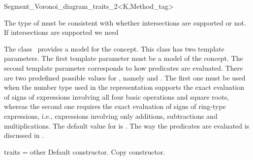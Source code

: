 


\begin{ccRefClass}{Segment_Voronoi_diagram_traits_2<K,Method_tag>}


{\sc The type of  must be consistent with whether
  intersections are supported or not. If intersections are supported
  we need }

\ccDefinition
  
The class \ccRefName\ provides a model for the
 concept.
This class has two template parameters. The first template parameter
must be a model of the  concept. The second template
parameter corresponds to how predicates are evaluated. There are two
predefined possible values for , namely
 and . The first one
must be used when the number type used in the representation supports
the exact evaluation of signs of expressions involving all four basic
operations and square roots, whereas the second one requires the exact
evaluation of signs of ring-type expressions, i.e., expressions
involving only additions, subtractions and multiplications. The
default value for  is .
%
The way the predicates are evaluated is discussed in
\cite{b-ecvdl-96,k-peasv-04}.



\ccIsModel
{}

\ccCreation
{}
{traits = other}{}
\ccThreeToTwo
%
	      {Default constructor.}
\ccGlue
{}
{Copy constructor.}
\ccGlue
{}



\end{ccRefClass}
